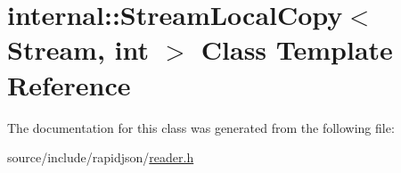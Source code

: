 \hypertarget{classinternal_1_1_stream_local_copy}{}\section{internal\+:\+:Stream\+Local\+Copy$<$ Stream, int $>$ Class Template Reference}
\label{classinternal_1_1_stream_local_copy}


The documentation for this class was generated from the following file\+:\begin{DoxyCompactItemize}
\item 
source/include/rapidjson/\hyperlink{reader_8h}{reader.\+h}\end{DoxyCompactItemize}
